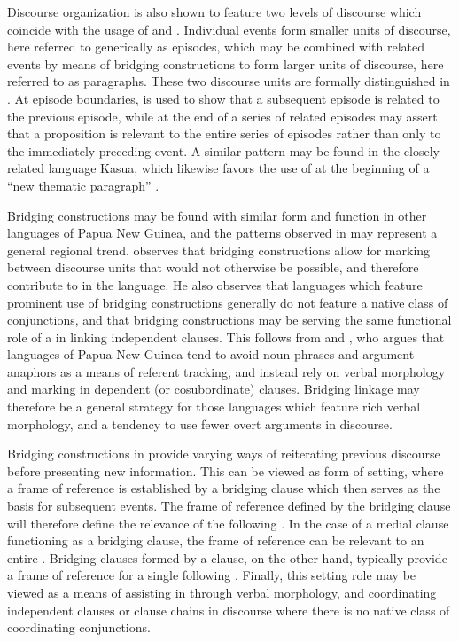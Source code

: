 \documentclass[output=paper]{LSP/langsci}
\begin{document}
Discourse organization is also shown to feature two levels of discourse which coincide with the usage of  and . Individual events form smaller units of discourse, here referred to generically as episodes, which may be combined with related events by means of bridging constructions to form larger units of discourse, here referred to as paragraphs. These two discourse units are formally distinguished in . At episode boundaries,  is used to show that a subsequent episode is related to the previous episode, while  at the end of a series of related episodes may assert that a proposition is relevant to the entire series of episodes rather than only to the immediately preceding event. A similar pattern may be found in the closely related language Kasua, which likewise favors the use of  at the beginning of a ``new thematic paragraph'' \citep[][24]{logan08}.

Bridging constructions may be found with similar form and function in other languages of Papua New Guinea, and the patterns observed in  may represent a general regional trend. \citet[][]{Jendraschek09} observes that bridging constructions allow for  marking between discourse units that would not otherwise be possible, and therefore contribute to  in the  language. He also observes that languages which feature prominent use of bridging constructions generally do not feature a native class of conjunctions, and that bridging constructions may be serving the same functional role of a  in linking independent clauses. This follows from \citet[][367]{devries.2005} and \citet[][374--375]{longacre07}, who argues that languages of Papua New Guinea tend to avoid noun phrases and argument anaphors as a means of referent tracking, and instead rely on verbal morphology and  marking in dependent (or cosubordinate) clauses. Bridging linkage may therefore be a general  strategy for those languages which feature rich verbal morphology, and a tendency to use fewer overt arguments in discourse.

Bridging constructions in  provide varying ways of reiterating previous discourse before presenting new information. This can be viewed as form of  setting, where a frame of reference is established by a bridging clause which then serves as the basis for subsequent events. The frame of reference defined by the bridging clause will therefore define the relevance of the following . In the case of a medial clause functioning as a bridging clause, the frame of reference can be relevant to an entire . Bridging clauses formed by a  clause, on the other hand, typically provide a frame of reference for a single following . Finally, this  setting role may be viewed as a means of assisting in  through verbal  morphology, and coordinating independent clauses or clause chains in discourse where there is no native class of coordinating conjunctions.
\end{document}
